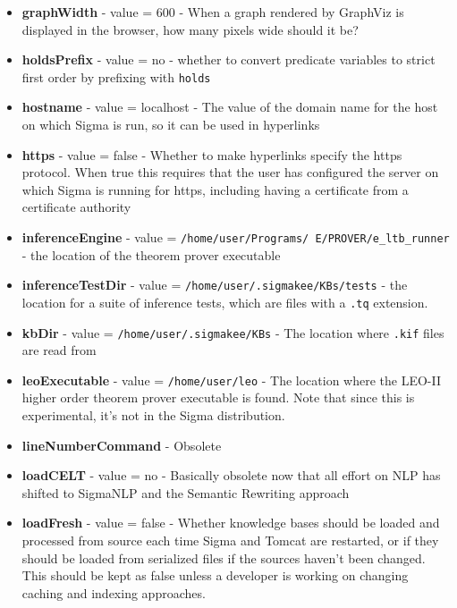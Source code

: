 \documentclass{book}
\begin{document}
\begin{itemize}
\item \textbf{graphWidth} - value = 600 - When a graph rendered by GraphViz is
displayed in the browser, how many pixels wide should it be?

\item \textbf{holdsPrefix} - value = no - whether to convert predicate variables
to strict first order by prefixing with \texttt{holds}

\item \textbf{hostname} - value = localhost - The value of the domain name for
the host on which Sigma is run, so it can be used in hyperlinks

\item \textbf{https} - value = false - Whether to make hyperlinks specify the
https protocol.  When true this requires that the user has configured the server
on which Sigma is running for https, including having a certificate from a
certificate authority

\item \begin{sloppypar}\textbf{inferenceEngine} - value =
\texttt{/home/user/Programs/ E/PROVER/e\_ltb\_runner} - the location of the theorem
prover executable\end{sloppypar}

\item \textbf{inferenceTestDir} - value =
\texttt{/home/user/.sigmakee/KBs/tests} - the location for a suite of inference
tests, which are files with a \texttt{.tq} extension.

\item \textbf{kbDir} - value = \texttt{/home/user/.sigmakee/KBs} - The location
where \texttt{.kif} files are read from 

\item \textbf{leoExecutable}  - value = \texttt{/home/user/leo} - The location
where the LEO-II higher order theorem prover executable is found.  Note that
since this is experimental, it's not in the Sigma distribution.

\item \textbf{lineNumberCommand} - Obsolete

\item \textbf{loadCELT} - value = no - Basically obsolete now that all effort
on NLP has shifted to SigmaNLP and the Semantic Rewriting approach

\item \textbf{loadFresh} - value = false - Whether knowledge bases should be
loaded and processed from source each time Sigma and Tomcat are restarted, or if
they should be loaded from serialized files if the sources haven't been changed.
This should be kept as false unless a developer is working on changing caching
and indexing approaches.


\end{itemize}
\end{document}
